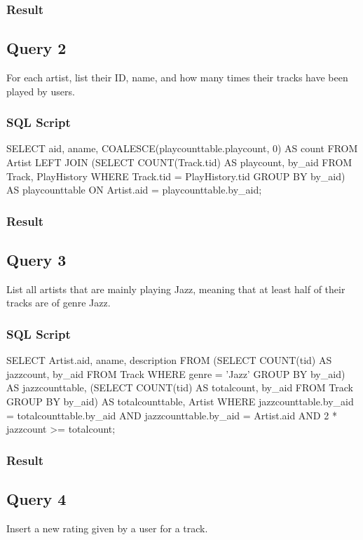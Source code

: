 \documentclass[letterpaper, 12pt]{report}
\begin{document}
	\subsubsection{Result}
	
	
	\subsection{Query 2}
	For each artist, list their ID, name, and how many times their tracks have been played by users.
	\subsubsection{SQL Script}
	\begin{spverbatim}
		SELECT aid, aname, COALESCE(playcounttable.playcount, 0) AS count 
		FROM Artist LEFT JOIN
		(SELECT COUNT(Track.tid) AS playcount, by_aid 
		FROM Track, PlayHistory
		WHERE Track.tid = PlayHistory.tid
		GROUP BY by_aid) AS playcounttable
		ON Artist.aid = playcounttable.by_aid;
	\end{spverbatim}
	\subsubsection{Result}
	
	\subsection{Query 3}
	List all artists that are mainly playing Jazz, meaning that at least half of their tracks are of genre Jazz.
	\subsubsection{SQL Script}
	\begin{spverbatim}
		SELECT Artist.aid, aname, description FROM
		(SELECT COUNT(tid) AS jazzcount, by_aid
		FROM Track
		WHERE genre = 'Jazz'
		GROUP BY by_aid) AS jazzcounttable,
		(SELECT COUNT(tid) AS totalcount, by_aid
		FROM Track
		GROUP BY by_aid) AS totalcounttable, Artist
		WHERE jazzcounttable.by_aid = totalcounttable.by_aid
		AND jazzcounttable.by_aid = Artist.aid
		AND 2 * jazzcount >= totalcount;
	\end{spverbatim}
	\subsubsection{Result}
	
	\subsection{Query 4}
	Insert a new rating given by a user for a track.
\end{document}
